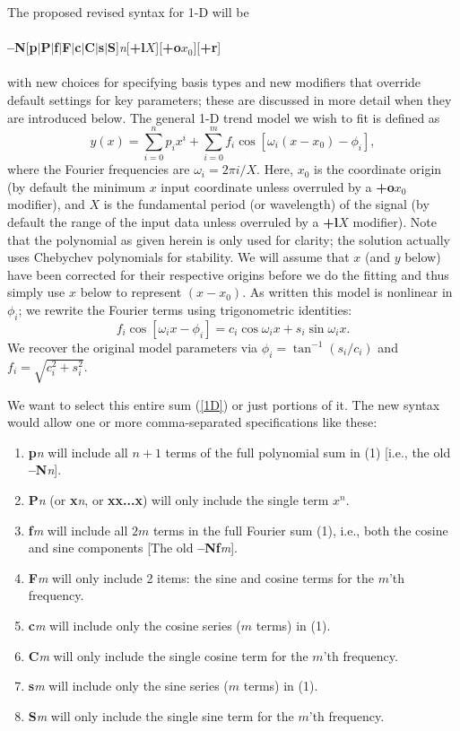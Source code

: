\documentclass[12pt,letterpaper,margin=0.5in]{report}
\begin{document}
The proposed revised syntax for 1-D will be
\\ \\
{\bf --N}[{\bf p}$|${\bf P}$|${\bf f}$|${\bf F}$|${\bf c}$|${\bf C}$|${\bf s}$|${\bf S}]{\it n}[{\bf +l}$X$][{\bf +o}$x_0$][{\bf +r}]
\\ \\
with new choices for specifying basis types and new modifiers that override default settings for key parameters; these are discussed
in more detail when they are introduced below.
The general 1-D trend model we wish to fit is defined as
\begin{equation}
y(x) = \sum_{i = 0}^n p_i x^i + \sum_{i = 0}^m  f_i \cos \left [\omega_i (x-x_0) - \phi_i \right ],
\label{1D}
\end{equation}
where the Fourier frequencies are $\omega_i = 2 \pi i / X$.  Here, $x_0$ is the coordinate origin (by default the minimum $x$ input coordinate unless overruled by
a {\bf +o}$x_0$ modifier), and $X$ is the fundamental period (or wavelength) of the signal (by default the range of the input data unless overruled by a {\bf +l}$X$ modifier). Note that the polynomial as given herein is only used for clarity; the solution actually uses Chebychev polynomials for stability.
We will assume that $x$ (and $y$ below) have been corrected for their respective origins before we do the fitting and thus simply
use $x$ below to represent $(x-x_0)$.  As written this model is nonlinear in $\phi_i$; we rewrite the Fourier terms using trigonometric identities:
\begin{equation}
f_i \cos \left [\omega_i x - \phi_i \right ] =  c_i \cos \omega_i x  + s_i \sin \omega_i x .
\end{equation}
We recover the original model parameters via $\phi_i = \tan^{-1}(s_i/c_i)$ and $f_i = \sqrt{c_i^2 + s_i^2}$.
\par
We want to select this entire sum (\ref{1D}) or just portions of it.  The new syntax would allow one or more comma-separated specifications like these:
\begin{enumerate}
	\item {\bf p}{\it n} will include all $n+1$ terms of the full polynomial sum in (1) [i.e., the old {\bf --N}{\it n}].
	\item {\bf P}{\it n} (or {\bf x}{\it n}, or {\bf xx...x}) will only include the single term $x^n$.
	\item {\bf f}{\it m} will include all $2m$ terms in the full Fourier sum (1), i.e., both the cosine and sine components [The old {\bf --Nf}{\it m}].
	\item {\bf F}{\it m} will only include 2 items: the sine and cosine terms for the $m$'th frequency.
	\item {\bf c}{\it m} will include only the cosine series ($m$ terms) in (1).
	\item {\bf C}{\it m} will only include the single cosine term for the $m$'th frequency.
	\item {\bf s}{\it m} will include only the sine series ($m$ terms) in (1).
	\item {\bf S}{\it m} will only include the single sine term for the $m$'th frequency.
\end{enumerate}
\end{document}
